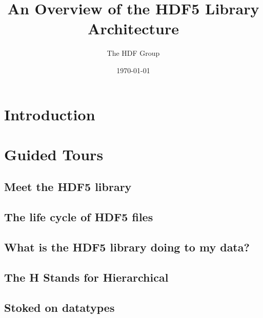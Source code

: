 \documentclass[letterpaper,hyper]{HDF}
\title{An Overview of the HDF5 Library Architecture}
\author{The HDF Group}
\date{\today}
\begin{document}
\maketitle



\makerevisions

\tableofcontents
\listoffigures
\listoflistings
{}

\newpage
\glsdisablehyper
\printglossary[type=\acronymtype]
\printglossary

\chapter{Introduction}


\chapter{Guided Tours}\label{part:tours}


\section{Meet the HDF5 library}\label{chap:hdf5-lib}


\section{The life cycle of HDF5 files}\label{sec:tour2}


\section{What is the HDF5 library doing to my data?}\label{sec:tour3}


\section{The H Stands for Hierarchical}\label{chap:groups-and-links}


\section{Stoked on datatypes}\label{sec:tour5}

\end{document}
